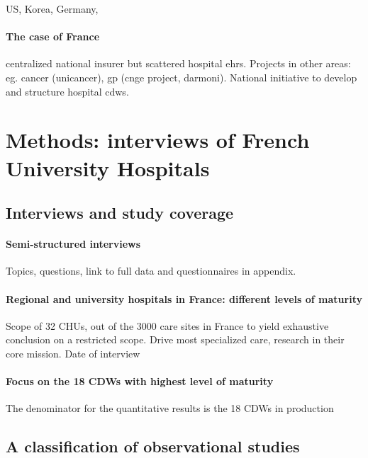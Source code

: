 \documentclass{report}
\begin{document}
US, Korea, Germany,

\paragraph{The case of France}

centralized national insurer but scattered hospital ehrs. Projects in other areas: eg. cancer (unicancer), gp (cnge project, darmoni). National initiative to develop and structure hospital cdws.


\section{Methods: interviews of French University Hospitals}\label{sec:cdw:methods}

\subsection{Interviews and study coverage}\label{subsec:cdw:interviews}

\paragraph{Semi-structured interviews}

Topics, questions, link to full data and questionnaires in appendix.

\paragraph{Regional and university hospitals in France: different levels of maturity}

Scope of 32 CHUs, out of the 3000 care sites in France to yield exhaustive
conclusion on a restricted scope. Drive most specialized care, research in their
core mission. Date of interview

\paragraph{Focus on the 18 CDWs with highest level of maturity}

The denominator for the quantitative results is the 18 CDWs in production

\subsection{A classification of observational
  studies}\label{subsec:cdw:classification}
\end{document}
